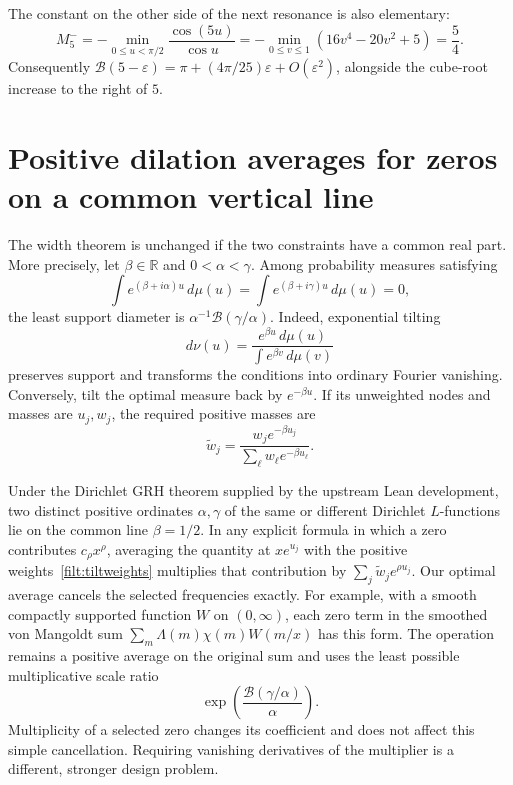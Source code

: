 The constant on the other side of the next resonance is also elementary:
\[
 M_5^-=-\min_{0\le u<\pi/2}
         \frac{\cos(5u)}{\cos u}
       =-\min_{0\le v\le1}(16v^4-20v^2+5)=\frac54.
\]
Consequently
$\mathcal B(5-\varepsilon)=\pi+(4\pi/25)\varepsilon
+O(\varepsilon^2)$, alongside the cube-root increase to the right of $5$.

\section{Positive dilation averages for zeros on a common vertical line}

The width theorem is unchanged if the two constraints have a common real
part.  More precisely, let $\beta\in\mathbb R$ and $0<\alpha<\gamma$.
Among probability measures satisfying
\[
 \int e^{(\beta+i\alpha)u}\,d\mu(u)=
 \int e^{(\beta+i\gamma)u}\,d\mu(u)=0,
\]
the least support diameter is $\alpha^{-1}\mathcal B(\gamma/\alpha)$.
Indeed, exponential tilting
\[
 d\nu(u)=\frac{e^{\beta u}\,d\mu(u)}{\int e^{\beta v}\,d\mu(v)}
\]
preserves support and transforms the conditions into ordinary Fourier
vanishing.  Conversely, tilt the optimal measure back by $e^{-\beta u}$.
If its unweighted nodes and masses are $u_j,w_j$, the required positive
masses are
\begin{equation}\label{filt:tiltweights}
 \widetilde w_j=
       \frac{w_je^{-\beta u_j}}{\sum_\ell w_\ell e^{-\beta u_\ell}}.
\end{equation}

Under the Dirichlet GRH theorem supplied by the upstream Lean development,
two distinct positive ordinates $\alpha,\gamma$ of the same or different
Dirichlet $L$-functions lie on the common line $\beta=1/2$.  In any explicit
formula in which a zero contributes $c_\rho x^\rho$, averaging the quantity
at $xe^{u_j}$ with the positive weights~\eqref{filt:tiltweights} multiplies
that contribution by
$\sum_j\widetilde w_je^{\rho u_j}$.  Our optimal average cancels the selected
frequencies exactly.  For example, with a smooth compactly supported
function $W$ on $(0,\infty)$, each zero term in the smoothed von Mangoldt
sum $\sum_m\Lambda(m)\chi(m)W(m/x)$ has this form.  The operation remains a
positive average on the original sum and uses the least possible
multiplicative scale ratio
\[
 \exp\!\left(\frac{\mathcal B(\gamma/\alpha)}{\alpha}\right).
\]
Multiplicity of a selected zero changes its coefficient and does not
affect this simple cancellation.  Requiring vanishing derivatives of the
multiplier is a different, stronger design problem.

